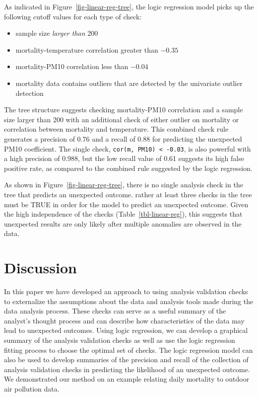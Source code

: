 \documentclass[
  12pt,
]{interact}
\providecommand{\tightlist}{%
  \setlength{\itemsep}{0pt}\setlength{\parskip}{0pt}}\usepackage{longtable,booktabs,array}
\begin{document}
As indicated in Figure~\ref{fig-linear-reg-tree}, the logic regression
model picks up the following cutoff values for each type of check:

\begin{itemize}
\tightlist
\item
  sample size \emph{larger than} 200
\item
  mortality-temperature correlation greater than \(-0.35\)
\item
  mortality-PM10 correlation less than \(-0.04\)
\item
  mortality data contains outliers that are detected by the univariate
  outlier detection
\end{itemize}

The tree structure suggests checking mortality-PM10 correlation and a
sample size larger than 200 with an additional check of either outlier
on mortality or correlation between mortality and temperature. This
combined check rule generates a precision of 0.76 and a recall of 0.88
for predicting the unexpected PM10 coefficient. The single check,
\texttt{cor(m,\ PM10)\ \textless{}\ -0.03}, is also powerful with a high
precision of 0.988, but the low recall value of 0.61 suggests its high
false positive rate, as compared to the combined rule suggested by the
logic regression.

As shown in Figure~\ref{fig-linear-reg-tree}, there is no single
analysis check in the tree that predicts an unexpected outcome. rather
at least three checks in the tree must be TRUE in order for the model to
predict an unexpected outcome. Given the high independence of the checks
(Table~\ref{tbl-linear-reg}), this suggests that unexpected results are
only likely after multiple anomalies are observed in the data.

\section{Discussion}\label{sec-discussion}

In this paper we have developed an approach to using analysis validation
checks to externalize the assumptions about the data and analysis tools
made during the data analysis process. These checks can serve as a
useful summary of the analyst's thought process and can describe how
characteristics of the data may lead to unexpected outcomes. Using logic
regression, we can develop a graphical summary of the analysis
validation checks as well as use the logic regression fitting process to
choose the optimal set of checks. The logic regression model can also be
used to develop summaries of the precision and recall of the collection
of analysis validation checks in predicting the likelihood of an
unexpected outcome. We demonstrated our method on an example relating
daily mortality to outdoor air pollution data.
\end{document}
